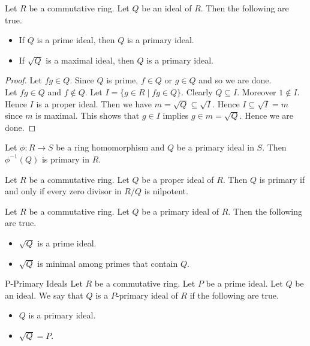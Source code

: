 \documentclass[a4paper]{article}
\begin{document}
\begin{lmm}{}{} Let $R$ be a commutative ring. Let $Q$ be an ideal of $R$. Then the following are true. 
\begin{itemize}
\item If $Q$ is a prime ideal, then $Q$ is a primary ideal. 
\item If $\sqrt{Q}$ is a maximal ideal, then $Q$ is a primary ideal. 
\end{itemize} 
\begin{proof}
Let $fg\in Q$. Since $Q$ is prime, $f\in Q$ or $g\in Q$ and so we are done. \\

Let $fg\in Q$ and $f\notin Q$. Let $I=\{g\in R\;|\;fg\in Q\}$. Clearly $Q\subseteq I$. Moreover $1\notin I$. Hence $I$ is a proper ideal. Then we have $m=\sqrt{Q}\subseteq\sqrt{I}$. Hence $I\subseteq\sqrt{I}=m$ since $m$ is maximal. This shows that $g\in I$ implies $g\in m=\sqrt{Q}$. Hence we are done. 
\end{proof}
\end{lmm}

\begin{lmm}{}{} Let $\phi:R\to S$ be a ring homomorphism and $Q$ be a primary ideal in $S$. Then $\phi^{-1}(Q)$ is primary in $R$. 
\end{lmm}

\begin{prp}{}{} Let $R$ be a commutative ring. Let $Q$ be a proper ideal of $R$. Then $Q$ is primary if and only if every zero divisor in $R/Q$ is nilpotent. 
\end{prp}

\begin{lmm}{}{} Let $R$ be a commutative ring. Let $Q$ be a primary ideal of $R$. Then the following are true. 
\begin{itemize}
\item $\sqrt{Q}$ is a prime ideal. 
\item $\sqrt{Q}$ is minimal among primes that contain $Q$. 
\end{itemize}
\end{lmm}

\begin{defn}{P-Primary Ideals}{} Let $R$ be a commutative ring. Let $P$ be a prime ideal. Let $Q$ be an ideal. We say that $Q$ is a $P$-primary ideal of $R$ if the following are true. 
\begin{itemize}
\item $Q$ is a primary ideal. 
\item $\sqrt{Q}=P$. 
\end{itemize}
\end{defn}
\end{document}
